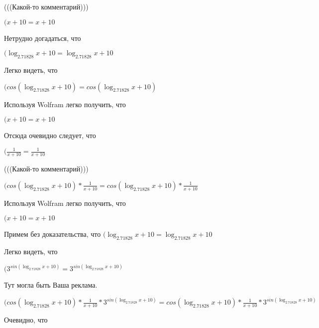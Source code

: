 \documentclass[12pt,a4paper,fleqn]{article}
\theoremstyle{definition}
\begin{document}
(((Какой-то комментарий)))

$( x  +  10  =  x  +  10 $

Нетрудно догадаться, что

$(\log_{ 2.71828 }{ x  +  10 } = \log_{ 2.71828 }{ x  +  10 }$

Легко видеть, что

$(cos(\log_{ 2.71828 }{ x  +  10 }) = cos(\log_{ 2.71828 }{ x  +  10 })$

Используя Wolfram легко получить, что

$( x  +  10  =  x  +  10 $

Отсюда очевидно следует, что

$(\frac{ 1 }{ x  +  10 }
 = \frac{ 1 }{ x  +  10 }
$

(((Какой-то комментарий)))

$(cos(\log_{ 2.71828 }{ x  +  10 }) * \frac{ 1 }{ x  +  10 }
 = cos(\log_{ 2.71828 }{ x  +  10 }) * \frac{ 1 }{ x  +  10 }
$

Используя Wolfram легко получить, что

$( x  +  10  =  x  +  10 $

Примем без доказательства, что
$(\log_{ 2.71828 }{ x  +  10 } = \log_{ 2.71828 }{ x  +  10 }$

Легко видеть, что

$({ 3 }^{sin(\log_{ 2.71828 }{ x  +  10 })} = { 3 }^{sin(\log_{ 2.71828 }{ x  +  10 })}$

Тут могла быть Ваша реклама.

$(cos(\log_{ 2.71828 }{ x  +  10 }) * \frac{ 1 }{ x  +  10 }
 * { 3 }^{sin(\log_{ 2.71828 }{ x  +  10 })} = cos(\log_{ 2.71828 }{ x  +  10 }) * \frac{ 1 }{ x  +  10 }
 * { 3 }^{sin(\log_{ 2.71828 }{ x  +  10 })}$

Очевидно, что
\end{document}
